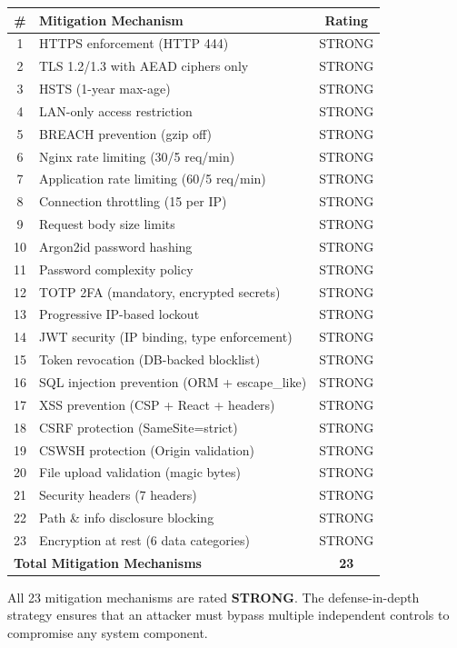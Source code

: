 \documentclass[11pt,a4paper]{article}
\begin{document}
\begin{center}
\begin{tabular}{clc}
\toprule
\textbf{\#} & \textbf{Mitigation Mechanism} & \textbf{Rating} \\
\midrule
1 & HTTPS enforcement (HTTP 444) & STRONG \\
2 & TLS 1.2/1.3 with AEAD ciphers only & STRONG \\
3 & HSTS (1-year max-age) & STRONG \\
4 & LAN-only access restriction & STRONG \\
5 & BREACH prevention (gzip off) & STRONG \\
6 & Nginx rate limiting (30/5 req/min) & STRONG \\
7 & Application rate limiting (60/5 req/min) & STRONG \\
8 & Connection throttling (15 per IP) & STRONG \\
9 & Request body size limits & STRONG \\
10 & Argon2id password hashing & STRONG \\
11 & Password complexity policy & STRONG \\
12 & TOTP 2FA (mandatory, encrypted secrets) & STRONG \\
13 & Progressive IP-based lockout & STRONG \\
14 & JWT security (IP binding, type enforcement) & STRONG \\
15 & Token revocation (DB-backed blocklist) & STRONG \\
16 & SQL injection prevention (ORM + escape\_like) & STRONG \\
17 & XSS prevention (CSP + React + headers) & STRONG \\
18 & CSRF protection (SameSite=strict) & STRONG \\
19 & CSWSH protection (Origin validation) & STRONG \\
20 & File upload validation (magic bytes) & STRONG \\
21 & Security headers (7 headers) & STRONG \\
22 & Path \& info disclosure blocking & STRONG \\
23 & Encryption at rest (6 data categories) & STRONG \\
\midrule
\multicolumn{2}{l}{\textbf{Total Mitigation Mechanisms}} & \textbf{23} \\
\bottomrule
\end{tabular}
\end{center}

\vspace{1em}

All 23 mitigation mechanisms are rated \textbf{STRONG}. The defense-in-depth strategy ensures that an attacker must bypass multiple independent controls to compromise any system component.
\end{document}
